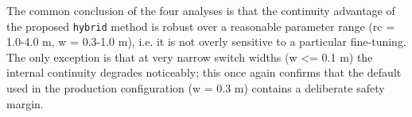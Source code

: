 The common conclusion of the four analyses is that the continuity advantage of the proposed \texttt{hybrid} method is robust over a reasonable parameter range (rc = 1.0-4.0 m, w = 0.3-1.0 m), i.e. it is not overly sensitive to a particular fine-tuning. The only exception is that at very narrow switch widths (w <= 0.1 m) the internal continuity degrades noticeably; this once again confirms that the default used in the production configuration (w = 0.3 m) contains a deliberate safety margin.

